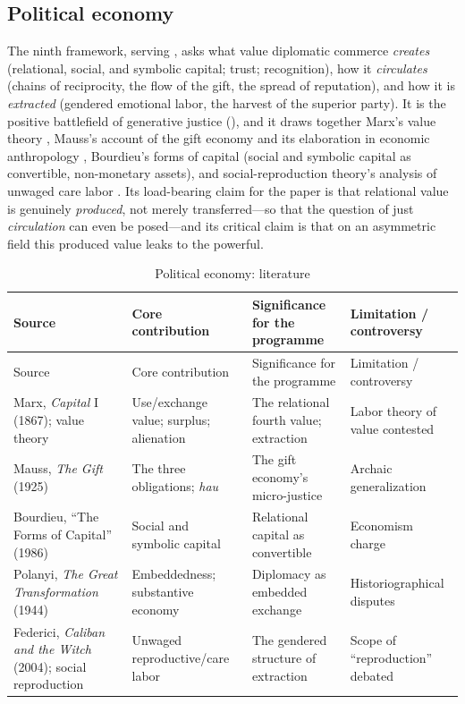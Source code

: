 \subsection{Political economy}
The ninth framework, serving , asks what value diplomatic commerce \emph{creates} (relational, social, and symbolic capital; trust; recognition), how it \emph{circulates} (chains of reciprocity, the flow of the gift, the spread of reputation), and how it is \emph{extracted} (gendered emotional labor, the harvest of the superior party). It is the positive battlefield of generative justice (), and it draws together Marx's value theory \parencite{marx1867capital}, Mauss's account of the gift economy \parencite{mauss1925gift} and its elaboration in economic anthropology \parencite{levistrauss1949,sahlins1972}, Bourdieu's forms of capital \parencite{bourdieu1986forms} (social and symbolic capital as convertible, non-monetary assets), and social-reproduction theory's analysis of unwaged care labor \parencite{federici2004}. Its load-bearing claim for the paper is that relational value is genuinely \emph{produced}, not merely transferred---so that the question of just \emph{circulation} can even be posed---and its critical claim is that on an asymmetric field this produced value leaks to the powerful.

\goldrule
\footnotesize
\begin{longtable}{Y Y Y Y}
\caption{Political economy: literature}\label{p07:tab:lit-polecon}\\
\toprule
{}
Source & Core contribution & Significance for the programme & Limitation / controversy \\
\midrule
\endfirsthead
{}
Source & Core contribution & Significance for the programme & Limitation / controversy \\
\midrule
\endhead
Marx, \emph{Capital} I (1867); value theory & Use/exchange value; surplus; alienation & The relational fourth value; extraction & Labor theory of value contested \\
Mauss, \emph{The Gift} (1925) & The three obligations; \emph{hau} & The gift economy's micro-justice & Archaic generalization \\
Bourdieu, ``The Forms of Capital'' (1986) & Social and symbolic capital & Relational capital as convertible & Economism charge \\
Polanyi, \emph{The Great Transformation} (1944) & Embeddedness; substantive economy & Diplomacy as embedded exchange & Historiographical disputes \\
Federici, \emph{Caliban and the Witch} (2004); social reproduction & Unwaged reproductive/care labor & The gendered structure of extraction & Scope of ``reproduction'' debated \\
\bottomrule
\end{longtable}

